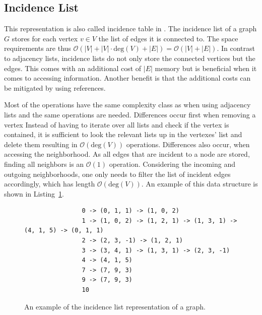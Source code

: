         \subsection{Incidence List}\label{inci}
            This representation is also called incidence table in \autocite{Gross1998GraphTA}.
            The incidence list of a graph $G$ stores for each vertex $v \in V$ the list of edges it is connected to. 
            The space requirements are thus $\mathcal{O}(|V| + |V| \cdot \text{deg}(V) + |E|) = \mathcal{O}(|V| + |E|)$. 
            In contrast to adjacency lists, incidence lists do not only store the connected vertices but the edges. 
            This comes with an additional cost of $|E|$ memory but is beneficial when it comes to accessing information. 
            Another benefit is that the additional costs can be mitigated by using references.
            
            Most of the operations have the same complexity class as when using adjacency lists and the same operations are needed. 
            Differences occur first when removing a vertex
            Instead of having to iterate over all lists and check if the vertex is contained, it is sufficient to look the relevant lists up in the vertexes' list and delete them resulting in $\mathcal{O}(\text{deg}(V))$ operations.        
            Differences also occur, when accessing the neighborhood. 
            As all edges that are incident to a node are stored, finding all neighbors is an $\mathcal{O}(1)$ operation. 
            Considering the incoming and outgoing neighborhoods, one only needs to filter the list of incident edges accordingly, which has length $\mathcal{O}(\text{deg}(V))$.
            An example of this data structure is shown in Listing~\ref{incidencel}.
        
            \begin{figure}[htp]
            \begin{center}
            \begin{verbatim}
                0 -> (0, 1, 1) -> (1, 0, 2)
                1 -> (1, 0, 2) -> (1, 2, 1) -> (1, 3, 1) -> (4, 1, 5) -> (0, 1, 1)
                2 -> (2, 3, -1) -> (1, 2, 1)
                3 -> (3, 4, 1) -> (1, 3, 1) -> (2, 3, -1)
                4 -> (4, 1, 5)
                7 -> (7, 9, 3)
                9 -> (7, 9, 3)
                10
            \end{verbatim}
            \end{center}
            \caption{An example of the incidence list representation of a graph.}
            \label{incidencel}
            \end{figure}
            
